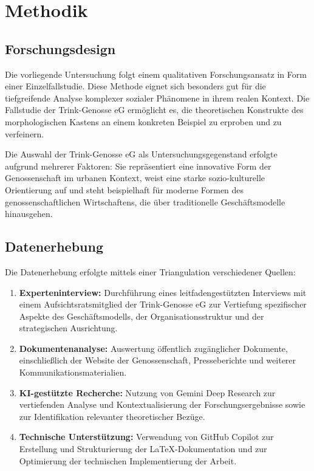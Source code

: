 \section{Methodik}

\subsection{Forschungsdesign}

Die vorliegende Untersuchung folgt einem qualitativen Forschungsansatz in Form einer Einzelfallstudie. Diese Methode eignet sich besonders gut für die tiefgreifende Analyse komplexer sozialer Phänomene in ihrem realen Kontext. Die Fallstudie der Trink-Genosse eG ermöglicht es, die theoretischen Konstrukte des morphologischen Kastens an einem konkreten Beispiel zu erproben und zu verfeinern.

Die Auswahl der Trink-Genosse eG als Untersuchungsgegenstand erfolgte aufgrund mehrerer Faktoren: Sie repräsentiert eine innovative Form der Genossenschaft im urbanen Kontext, weist eine starke sozio-kulturelle Orientierung auf und steht beispielhaft für moderne Formen des genossenschaftlichen Wirtschaftens, die über traditionelle Geschäftsmodelle hinausgehen.

\subsection{Datenerhebung}

Die Datenerhebung erfolgte mittels einer Triangulation verschiedener Quellen:

\begin{enumerate}
\item \textbf{Experteninterview:} Durchführung eines leitfadengestützten Interviews mit einem Aufsichtsratsmitglied der Trink-Genosse eG zur Vertiefung spezifischer Aspekte des Geschäftsmodells, der Organisationsstruktur und der strategischen Ausrichtung.

\item \textbf{Dokumentenanalyse:} Auswertung öffentlich zugänglicher Dokumente, einschließlich der Website der Genossenschaft, Presseberichte und weiterer Kommunikationsmaterialien.

\item \textbf{KI-gestützte Recherche:} Nutzung von Gemini Deep Research zur vertiefenden Analyse und Kontextualisierung der Forschungsergebnisse sowie zur Identifikation relevanter theoretischer Bezüge.

\item \textbf{Technische Unterstützung:} Verwendung von GitHub Copilot zur Erstellung und Strukturierung der \LaTeX-Dokumentation und zur Optimierung der technischen Implementierung der Arbeit.

\end{enumerate}

